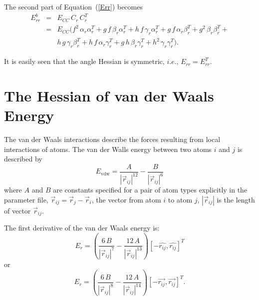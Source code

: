 \documentclass[11pt]{article}
\newcommand{\Vr}[1]{\mbox{$\vec{r}_{#1}$}}
\newcommand{\hatr}[1]{\mbox{$\hat{{r}_{#1}}$}}
\newcommand{\AbsVr}[1]{\mbox{$\left| \vec{r}_{#1} \right| $}}
\begin{document}
The second part of Equation~(\ref{Err}) becomes
\begin{eqnarray}
E_{rr}^{b} &=& E_{CC}\,C_r\,C_r^T \nonumber\\
&=& E_{CC} (f^2 \,\alpha_{r} \alpha_{r}^T + 
g\,f\,\beta_{r} \alpha_{r}^T + 
h\,f\,\gamma_{r} \alpha_{r}^T + 
g\,f\,\alpha_{r} \beta_{r}^T + 
g^2 \,\beta_{r} \beta_{r}^T + \nonumber \\
&&h\,g\,\gamma_{r} \beta_{r}^T + 
h\,f\,\alpha_{r} \gamma_{r}^T + 
g\,h\,\beta_{r} \gamma_{r}^T + 
h^2 \,\gamma_{r} \gamma_{r}^T).
\end{eqnarray}

It is easily seen that the angle Hessian is symmetric, $i.e.$,
$E_{rr}=E_{rr}^T$. 

\section{The Hessian of van der Waals Energy}
The van der Waals interactions describe the forces resulting from
local interactions of atoms. The van der Walls energy between two
atoms $i$ and $j$ is described by
\begin{equation}
E_{\mathrm{vdw}}= \frac{A}{\AbsVr{ij}^{12}}-\frac{B}{\AbsVr{ij}^{6}}
\end{equation}
where $A$ and $B$ are constants specified for a pair of atom types
explicitly in the parameter file,  $\Vr{ij} = \Vr{j} - \Vr{i}$, the
vector from atom $i$ to atom $j$, $\AbsVr{ij}$ is the length of vector
$\Vr{ij}$.    

The first derivative of the van der Waals energy is:
\begin{equation}
E_r= \left(\frac{6 \,B}{\AbsVr{ij}^{7}}-\frac{12
\,A}{\AbsVr{ij}^{13}}\right)[-\hatr{ij}, \hatr{ij}]^T
\end{equation}
or
\begin{equation}
E_r= \left(\frac{6 \,B}{\AbsVr{ij}^{8}}-\frac{12
\,A}{\AbsVr{ij}^{14}}\right)[-\vec{r_{ij}}, \vec{r_{ij}}]^T.
\end{equation}
\end{document}
